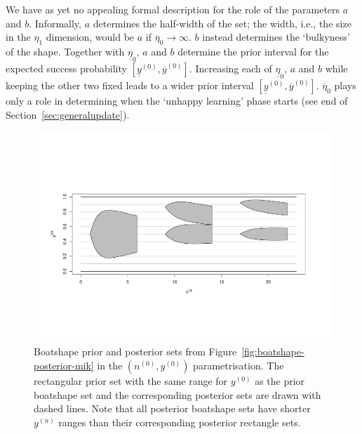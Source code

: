\documentclass[runningheads,a4paper]{llncs}
\newcommand{\uz}{^{(0)}} %
\newcommand{\un}{^{(n)}} %
\newcommand{\ul}[1]{\underline{#1}}
\newcommand{\ol}[1]{\overline{#1}}
\def\yz{y\uz}
\def\yn{y\un}
\def\yzl{\ul{y}\uz}
\def\yzu{\ol{y}\uz}
\def\nz{n\uz}
\def\ezl{\ul{\eta}_0}
\def\ezu{\ol{\eta}_0}
\begin{document}
We have as yet no appealing formal description for the role of the parameters $a$ and $b$. %
Informally, $a$ determines the half-width of the set;
the width, i.e., the size in the $\eta_1$ dimension, would be $a$ if $\ezu \to \infty$.
$b$ instead determines the `bulkyness' of the shape.
Together with $\ezl$, $a$ and $b$ determine the prior interval for the expected success probability $[\yzl, \yzu]$.
Increasing each of $\ezl$, $a$ and $b$ while keeping the other two fixed leads to a wider prior interval $[\yzl, \yzu]$.
$\ezu$ plays only a role in determining when the `unhappy learning' phase starts
(see end of Section~\ref{sec:generalupdate}).
\begin{figure}  %
\centering
\includegraphics[width=\textwidth]{R/boatshape-posterior-normal}%
\caption[Boatshape prior and posterior sets from Figure~\ref{fig:boatshape-posterior-mik} in the $(\nz,\yz)$ parametrisation.]%
{Boatshape prior and posterior sets from Figure~\ref{fig:boatshape-posterior-mik} in the $(\nz,\yz)$ parametrisation.
The rectangular prior set with the same range for $\yz$ as the prior boatshape set
and the corresponding posterior sets are drawn with dashed lines. 
Note that all posterior boatshape sets have shorter $\yn$ ranges than their corresponding posterior rectangle sets.}
\label{fig:boatshape-posterior-normal}
\end{figure}
\end{document}

